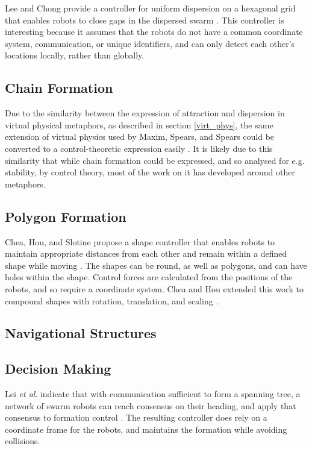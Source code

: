 \documentclass[]{article}
\begin{document}
Lee and Chong provide a controller for uniform dispersion on a hexagonal grid that enables robots to close gaps in the dispersed swarm \cite{lee2008geometric}. 
This controller is interesting because it assumes that the robots do not have a common coordinate system, communication, or unique identifiers, and can only detect each other's locations locally, rather than globally. 

\subsection{Chain Formation}

Due to the similarity between the expression of attraction and dispersion in virtual physical metaphors, as described in section \ref{virt_phys}, the same extension of virtual physics used by Maxim, Spears, and Spears could be converted to a control-theoretic expression easily \cite{maxim2009robotic}.
It is likely due to this similarity that while chain formation could be expressed, and so analysed for e.g. stability, by control theory, most of the work on it has developed around other metaphors. 

\subsection{Polygon Formation}

Chea, Hou, and Slotine propose a shape controller that enables robots to maintain appropriate distances from each other and remain within a defined shape while moving \cite{cheah2009region}.
The shapes can be round, as well as polygons, and can have holes within the shape. 
Control forces are calculated from the positions of the robots, and so require a coordinate system. 
Chea and Hou extended this work to compound shapes with rotation, translation, and scaling \cite{hou2012dynamic}.

\subsection{Navigational Structures}

\subsection{Decision Making}

Lei \textit{et al}. indicate that with communication sufficient to form a spanning tree, a network of swarm robots can reach consensus on their heading, and apply that consensus to formation control \cite{lei2015consensus}.
The resulting controller does rely on a coordinate frame for the robots, and maintains the formation while avoiding collisions. 
 
\end{document}
